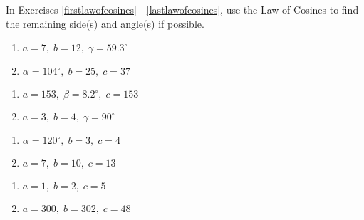 \documentclass{ximera}
\begin{document}
	\author{Stitz-Zeager}


In Exercises \ref{firstlawofcosines} - \ref{lastlawofcosines}, use the Law of Cosines to find the remaining side(s) and angle(s) if possible.

\begin{multicols}{2}

\begin{enumerate}

\item $a = 7, \; b = 12, \; \gamma = 59.3^{\circ}$ \label{firstlawofcosines}
\item $\alpha = 104^{\circ}, \; b = 25, \; c  = 37$

\setcounter{HW}{\value{enumi}}

\end{enumerate}

\end{multicols}

\begin{multicols}{2} 

\begin{enumerate}

\setcounter{enumi}{\value{HW}}

\item $a = 153, \; \beta = 8.2^{\circ}, \; c = 153$
\item $a = 3, \; b = 4, \; \gamma = 90^{\circ}$

\setcounter{HW}{\value{enumi}}

\end{enumerate}

\end{multicols}

\begin{multicols}{2} 

\begin{enumerate}

\setcounter{enumi}{\value{HW}}

\item $\alpha = 120^{\circ}, \; b = 3, \; c = 4$
\item $a = 7, \; b = 10, \; c = 13$ \label{firstherons}

\setcounter{HW}{\value{enumi}}

\end{enumerate}

\end{multicols}

\begin{multicols}{2} 

\begin{enumerate}

\setcounter{enumi}{\value{HW}}

\item $a = 1, \; b = 2, \; c = 5$
\item $a = 300, \; b = 302, \; c = 48$ \label{secondherons}

\setcounter{HW}{\value{enumi}}

\end{enumerate}

\end{multicols}
\end{document}
